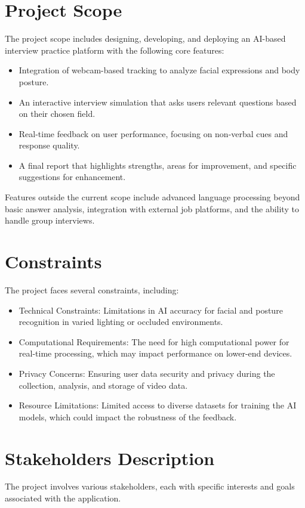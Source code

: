 \section{Project Scope} The project scope includes designing, developing, and deploying an AI-based interview practice platform with the following core features: \begin{itemize} \item Integration of webcam-based tracking to analyze facial expressions and body posture. \item An interactive interview simulation that asks users relevant questions based on their chosen field. \item Real-time feedback on user performance, focusing on non-verbal cues and response quality. \item A final report that highlights strengths, areas for improvement, and specific suggestions for enhancement. \end{itemize}

Features outside the current scope include advanced language processing beyond basic answer analysis, integration with external job platforms, and the ability to handle group interviews.

\section{Constraints} The project faces several constraints, including: \begin{itemize} \item Technical Constraints: Limitations in AI accuracy for facial and posture recognition in varied lighting or occluded environments. \item Computational Requirements: The need for high computational power for real-time processing, which may impact performance on lower-end devices. \item Privacy Concerns: Ensuring user data security and privacy during the collection, analysis, and storage of video data. \item Resource Limitations: Limited access to diverse datasets for training the AI models, which could impact the robustness of the feedback. \end{itemize}

\section{Stakeholders Description} The project involves various stakeholders, each with specific interests and goals associated with the application.

